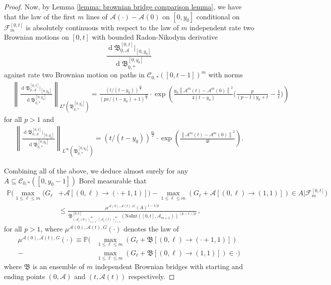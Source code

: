 \documentclass[11pt, reqno]{amsart}
\numberwithin{equation}{section}
\newcommand{\PP}{\ensuremath{\mathbb{P}}}
\newcommand{\norm}[1]{\left\lVert#1\right\rVert}
\newcommand{\diff}{\ensuremath{\operatorname{d}\!}}
\begin{document}
\begin{proof}
Now, by Lemma \ref{lemma: brownian bridge comparison lemma}, we have that the law of the first $m$ lines of $\mathcal{A}(\cdot)-\mathcal{A}(0)$ on $[0,y_0]$ conditional on $\mathcal{F}^{[0,t]}_m$ is absolutely continuous with respect to the law of $m$ independent rate two Brownian motions on $[0,t]$ with bounded Radon-Nikodym derivative
\begin{equation*}
\frac{\diff\mathfrak{B}^{[0, t]}_{\underline{0}, \underline{\mathcal{A}}}|_{[0,y_0]}}{\diff\mathfrak{B}^{[0, y_0]}_{\underline{0}, *}}
\end{equation*}
against rate two Brownian motion on paths in $\mathscr{C}_{0,*}([0,t-1])^{m}$ with norms
\begin{equation*}
    \begin{array}{cc}
         & \norm{\frac{\diff\mathfrak{B}^{[0, t]}_{\underline{0}, \mathcal{A}}|_{[0,y_0]}}{\diff\mathfrak{B}^{[0, y_0]}_{\underline{0}, *}}}_{L^p\left(\mathfrak{B}^{[0, y_0]}_{\underline{0}, *}\right)} = \frac{(t/(t-y_0))^{\frac{m}{2}}}{(px/(t-y_0)+1)^{\frac{m}{2}}}\cdot \exp\left({\frac{y_0\norm{\mathcal{A}^m(t)-\mathcal{A}^m(0)}^2}{4(t-y_0)}\big(\frac{p}{(p-1)y_0+t}-\frac{1}{t}\big)}\right)
    \end{array}
\end{equation*}
        for all $p>1$ and 
\begin{equation*}
  \begin{array}{cc}
    \norm{\frac{\diff\mathfrak{B}^{[0, t]}_{\underline{0}, \underline{\mathcal{A}}}|_{[0,y_0]}}{\diff\mathfrak{B}^{[0, y_0]}_{\underline{0}, *}}}_{L^\infty\left(\mathfrak{B}^{[0, y_0]}_{\underline{0}, *}\right)} = (t/(t-y_0))^{\frac{m}{2}}\cdot \exp\left(\frac{\norm{\mathcal{A}^m(t)-\mathcal{A}^m(0)}^2}{4t}\right). 
        \end{array}
\end{equation*}

Combining all of the above, we deduce almost surely for any $A\subseteq \mathscr{C}_{0,*}([0,y_0-1])$ Borel measurable that
\begin{align*}
     \PP \bigg(\displaystyle\max_{1\le \ell \le m}(G_\ell &+ \mathcal{A}[(0,\ell)\to (\cdot+1,1)])-\displaystyle\max_{1\le \ell \le m}(G_\ell + \mathcal{A}[(0,\ell)\to (1,1)])\in A \bigg| \mathcal{F}^{[0,t]}_m\bigg)\\
     & \le \displaystyle\frac{\mu^{\mathcal{A}(0), \mathcal{A}(t), G}(A)^{1-1/p}}{\mathfrak{B}^{[0,t]}_{(\mathcal{A}_i(0))_{i=1}^m, (\mathcal{A}_i(t))_{i=1}^m}(\mathrm{NoInt}([0,t], \mathcal{A}_{m+1}))^{(p-1)/p}} \,,
\end{align*}
for all $p>1$, where $\mu^{\mathcal{A}(0), \mathcal{A}(t), G}(\cdot)$ denotes the law of 
\begin{align*}
\mu^{\mathcal{A}(0), \mathcal{A}(t), G}(\cdot) \equiv \PP \bigg( &\displaystyle\max_{1\le \ell \le m}(G_\ell + \mathfrak{B}[(0,\ell)\to (\cdot+1,1)])\\
-&\displaystyle\max_{1\le \ell \le m}(G_\ell + \mathfrak{B}[(0,\ell)\to (1,1)])\in \cdot \bigg)
\end{align*}
where $\mathfrak{B}$ is an ensemble of $m$ independent Brownian bridges with starting and ending points $(0, \mathcal{A})$ and $(t, \mathcal{A}(t))$ respectively.


\end{proof}
\end{document}
